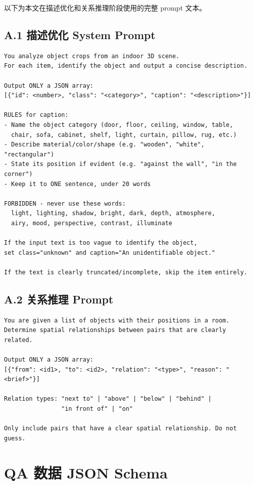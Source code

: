 \documentclass[type=bachelor,oneside]{fduthesis}
\begin{document}
以下为本文在描述优化和关系推理阶段使用的完整 prompt 文本。

\section*{A.1 描述优化 System Prompt}

\begin{verbatim}
You analyze object crops from an indoor 3D scene.
For each item, identify the object and output a concise description.

Output ONLY a JSON array:
[{"id": <number>, "class": "<category>", "caption": "<description>"}]

RULES for caption:
- Name the object category (door, floor, ceiling, window, table,
  chair, sofa, cabinet, shelf, light, curtain, pillow, rug, etc.)
- Describe material/color/shape (e.g. "wooden", "white", "rectangular")
- State its position if evident (e.g. "against the wall", "in the corner")
- Keep it to ONE sentence, under 20 words

FORBIDDEN - never use these words:
  light, lighting, shadow, bright, dark, depth, atmosphere,
  airy, mood, perspective, contrast, illuminate

If the input text is too vague to identify the object,
set class="unknown" and caption="An unidentifiable object."

If the text is clearly truncated/incomplete, skip the item entirely.
\end{verbatim}

\section*{A.2 关系推理 Prompt}

\begin{verbatim}
You are given a list of objects with their positions in a room.
Determine spatial relationships between pairs that are clearly related.

Output ONLY a JSON array:
[{"from": <id1>, "to": <id2>, "relation": "<type>", "reason": "<brief>"}]

Relation types: "next to" | "above" | "below" | "behind" |
                "in front of" | "on"

Only include pairs that have a clear spatial relationship. Do not guess.
\end{verbatim}

\chapter{QA 数据 JSON Schema}
\end{document}
